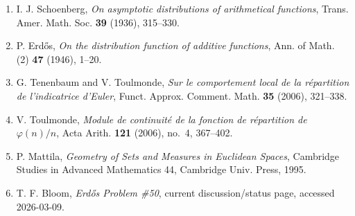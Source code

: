 \begin{enumerate}
\item I. J. Schoenberg, \emph{On asymptotic distributions of arithmetical functions}, Trans. Amer. Math. Soc. \textbf{39} (1936), 315--330.

\item P. Erd\H{o}s, \emph{On the distribution function of additive functions}, Ann. of Math. (2) \textbf{47} (1946), 1--20.

\item G. Tenenbaum and V. Toulmonde, \emph{Sur le comportement local de la r\'epartition de l'indicatrice d'Euler}, Funct. Approx. Comment. Math. \textbf{35} (2006), 321--338.

\item V. Toulmonde, \emph{Module de continuit\'e de la fonction de r\'epartition de $\varphi(n)/n$}, Acta Arith. \textbf{121} (2006), no.~4, 367--402.

\item P. Mattila, \emph{Geometry of Sets and Measures in Euclidean Spaces}, Cambridge Studies in Advanced Mathematics 44, Cambridge Univ. Press, 1995.

\item T. F. Bloom, \emph{Erd\H{o}s Problem \#50}, current discussion/status page, accessed 2026-03-09.
\end{enumerate}
